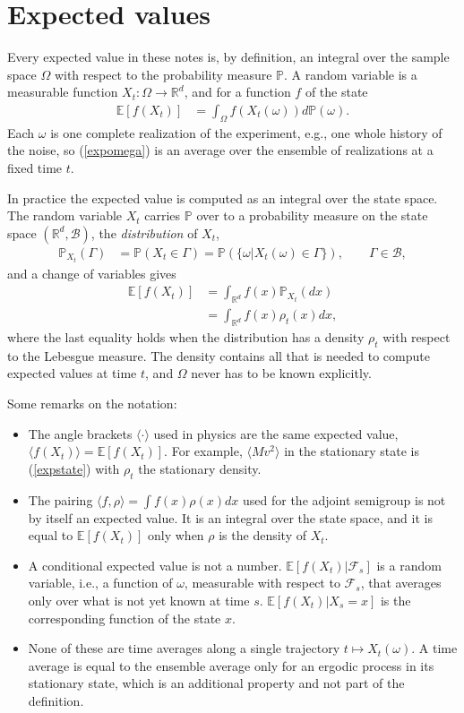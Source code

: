 \documentclass[11pt]{article}
\begin{document}
\section{Expected values}
Every expected value in these notes is, by definition, an integral over the sample space $\Omega$ with respect to the probability measure $\mathbb{P}$. A random variable is a measurable function $X_t:\Omega\rightarrow\mathbb{R}^d$, and for a function $f$ of the state
\begin{align}
  \mathbb{E}[f(X_t)]&=\int_{\Omega}f(X_t(\omega))d\mathbb{P}(\omega).
  \label{expomega}
\end{align}
Each $\omega$ is one complete realization of the experiment, e.g., one whole history of the noise, so (\ref{expomega}) is an average over the ensemble of realizations at a fixed time $t$.

In practice the expected value is computed as an integral over the state space. The random variable $X_t$ carries $\mathbb{P}$ over to a probability measure on the state space $(\mathbb{R}^d,\mathcal{B})$, the {\it distribution} of $X_t$,
\begin{align}
  \mathbb{P}_{X_t}(\Gamma)&=\mathbb{P}(X_t\in\Gamma)=\mathbb{P}(\{\omega|X_t(\omega)\in\Gamma\}),\qquad\Gamma\in\mathcal{B},
\end{align}
and a change of variables gives
\begin{align}
  \mathbb{E}[f(X_t)]&=\int_{\mathbb{R}^d}f(x)\mathbb{P}_{X_t}(dx)\nonumber\\
  &=\int_{\mathbb{R}^d}f(x)\rho_t(x)dx,
  \label{expstate}
\end{align}
where the last equality holds when the distribution has a density $\rho_t$ with respect to the Lebesgue measure. The density contains all that is needed to compute expected values at time $t$, and $\Omega$ never has to be known explicitly.

Some remarks on the notation:
\begin{itemize}
\item The angle brackets $\langle\cdot\rangle$ used in physics are the same expected value, $\langle f(X_t)\rangle=\mathbb{E}[f(X_t)]$. For example, $\langle Mv^2\rangle$ in the stationary state is (\ref{expstate}) with $\rho_t$ the stationary density.
\item The pairing $\langle f,\rho\rangle=\int f(x)\rho(x)dx$ used for the adjoint semigroup is not by itself an expected value. It is an integral over the state space, and it is equal to $\mathbb{E}[f(X_t)]$ only when $\rho$ is the density of $X_t$.
\item A conditional expected value is not a number. $\mathbb{E}[f(X_t)|\mathcal{F}_s]$ is a random variable, i.e., a function of $\omega$, measurable with respect to $\mathcal{F}_s$, that averages only over what is not yet known at time $s$. $\mathbb{E}[f(X_t)|X_s=x]$ is the corresponding function of the state $x$.
\item None of these are time averages along a single trajectory $t\mapsto X_t(\omega)$. A time average is equal to the ensemble average only for an ergodic process in its stationary state, which is an additional property and not part of the definition.
\end{itemize}
\end{document}
